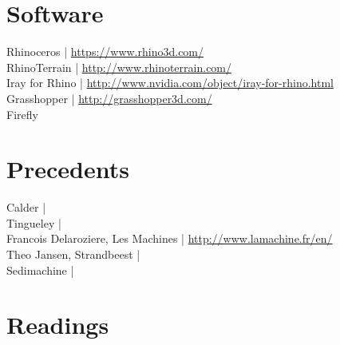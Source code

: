 \documentclass[11pt,article,oneside]{memoir}
\begin{document}
\section{Software}
Rhinoceros | \url{https://www.rhino3d.com/}\\
RhinoTerrain | \url{http://www.rhinoterrain.com/}\\
Iray for Rhino | \url{http://www.nvidia.com/object/iray-for-rhino.html}\\
Grasshopper | \url{http://grasshopper3d.com/}\\
Firefly %



\section{Precedents}

\noindent
Calder | \url{}\\
Tingueley | \url{}\\
Francois Delaroziere, Les Machines | \url{http://www.lamachine.fr/en/}\\
Theo Jansen, Strandbeest  | \url{}\\
%
Sedimachine | \url{}\\


\section{Readings}
\renewcommand*{\bibfont}{\normalsize} %
\vspace*{0.5cm}
\nocite{*}
\setlength{}
\printbibliography[heading=none]
\end{document}
